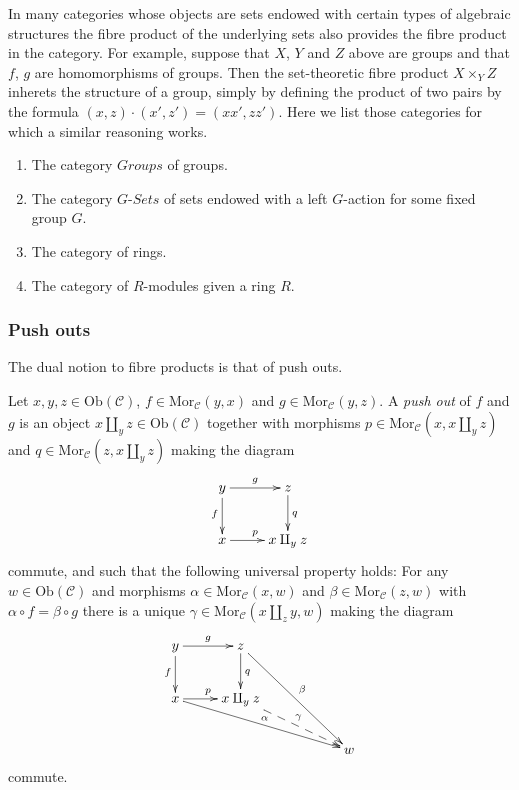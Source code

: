 \medskip\noindent
In many categories whose objects are sets endowed with certain types of
algebraic structures the fibre product of the underlying sets also
provides the fibre product in the category. For example, suppose
that $X$, $Y$ and $Z$ above are groups and that $f$, $g$ are
homomorphisms of groups. Then the set-theoretic fibre product
$X\times_Y Z$ inherets the structure of a group, simply by
defining the product of two pairs by the formula
$(x,z) \cdot (x',z') = (xx', zz')$. Here we list those categories
for which a similar reasoning works.
\begin{enumerate}
\item The category $\textit{Groups}$ of groups.
\item The category $G\textit{-Sets}$ of sets
endowed with a left $G$-action for some fixed group $G$.
\item The category of rings.
\item The category of $R$-modules given a ring $R$.
\end{enumerate}

\subsubsection{Push outs}
\label{subsubsection-pushouts}

\noindent
The dual notion to fibre products is that of push outs.

\begin{definition}
\label{definition-pushouts}
Let $x,y,z\in \text{Ob}(\mathcal{C})$,
$f\in \text{Mor}_{\mathcal{C}}(y, x)$
and $g\in \text{Mor}_{\mathcal C}(y, z)$.
A {\it push out} of $f$ and $g$ is
an object $x\amalg_y z\in \text{Ob}(\mathcal{C})$
together with morphisms 
$p\in \text{Mor}_{\mathcal C}(x, x\amalg_y z)$ and 
$q\in\text{Mor}_{\mathcal C}(z, x\amalg_y z)$ making the diagram
$$
\xymatrix{
y \ar[r]^{g} \ar[d]_{f}
&
z \ar[d]^{q}
\\
x \ar[r]^{p}
&
x\amalg_y z
}
$$
commute, and such that the following universal property holds:
For any $w\in \text{Ob}(\mathcal{C})$ and morphisms 
$\alpha \in \text{Mor}_{\mathcal C}(x, w)$ and 
$\beta \in \text{Mor}_{\mathcal{C}}(z, w)$ with
$\alpha \circ f = \beta \circ g$ there is a unique
$\gamma\in \text{Mor}_{\mathcal C}(x\amalg_z y, w)$ making
the diagram
$$
\xymatrix{
y \ar[r]^{g} \ar[d]_{f}
&
z \ar[d]^{q} \ar[rrdd]^\beta
&
&
\\
x \ar[r]^{p} \ar[rrrd]^\alpha
&
x\amalg_y z  \ar@{-->}[rrd]^\gamma
&
&
\\
&&&
w
}
$$
commute.
\end{definition}

